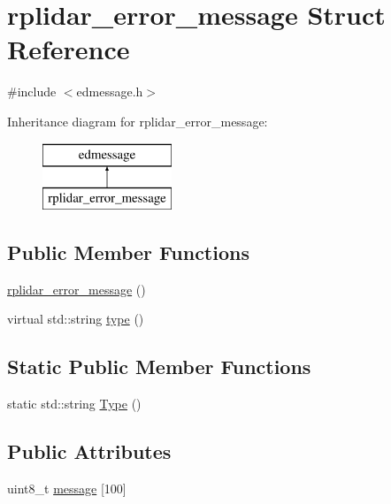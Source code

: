 \hypertarget{structrplidar__error__message}{\section{rplidar\-\_\-error\-\_\-message Struct Reference}
\label{structrplidar__error__message}
}


{\ttfamily \#include $<$edmessage.\-h$>$}

Inheritance diagram for rplidar\-\_\-error\-\_\-message\-:\begin{figure}[H]
\begin{center}
\leavevmode
\includegraphics[height=2.000000cm]{structrplidar__error__message}
\end{center}
\end{figure}
\subsection*{Public Member Functions}
\begin{DoxyCompactItemize}
\item 
\hyperlink{structrplidar__error__message_af4f1902c3778e4289eac7a4ab20cdc12}{rplidar\-\_\-error\-\_\-message} ()
\item 
virtual std\-::string \hyperlink{structrplidar__error__message_a3041dd23bfc9e0b5612bd7ce75849ea1}{type} ()
\end{DoxyCompactItemize}
\subsection*{Static Public Member Functions}
\begin{DoxyCompactItemize}
\item 
static std\-::string \hyperlink{structrplidar__error__message_aca98493f4795168785997efbb1008fae}{Type} ()
\end{DoxyCompactItemize}
\subsection*{Public Attributes}
\begin{DoxyCompactItemize}
\item 
uint8\-\_\-t \hyperlink{structrplidar__error__message_a788f75a0c9edbe2c0c154dbe3b48672f}{message} \mbox{[}100\mbox{]}
\end{DoxyCompactItemize}



